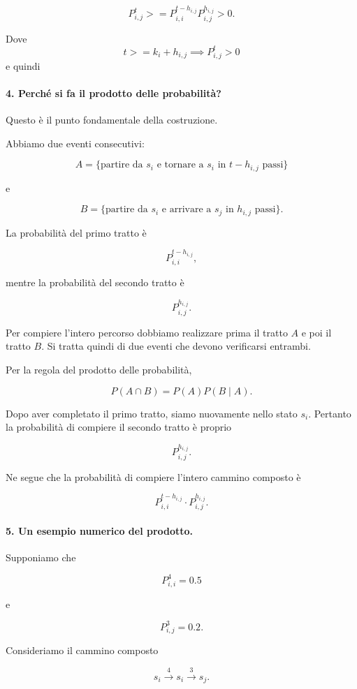 $$
P^{t}_{i,j}>= P^{t-h_{i,j}}_{i,i} P^{h_{i,j}}_{i,j} > 0.
$$

Dove 
$$
t >= k_i + h_{i,j} \implies P^{t}_{i,j} > 0
$$
e quindi


\paragraph{4. Perché si fa il prodotto delle probabilità?}

Questo è il punto fondamentale della costruzione.

Abbiamo due eventi consecutivi:

$$
A=
\{\text{partire da $s_i$ e tornare a $s_i$ in $t-h_{i,j}$ passi}\}
$$

e

$$
B=
\{\text{partire da $s_i$ e arrivare a $s_j$ in $h_{i,j}$ passi}\}.
$$

La probabilità del primo tratto è

$$
P^{t-h_{i,j}}_{i,i},
$$

mentre la probabilità del secondo tratto è

$$
P^{h_{i,j}}_{i,j}.
$$

Per compiere l'intero percorso dobbiamo realizzare prima il tratto $A$ e poi il tratto $B$. Si tratta quindi di due eventi che devono verificarsi entrambi.

Per la regola del prodotto delle probabilità,

$$
P(A\cap B)
=
P(A)P(B\mid A).
$$

Dopo aver completato il primo tratto, siamo nuovamente nello stato $s_i$. Pertanto la probabilità di compiere il secondo tratto è proprio

$$
P^{h_{i,j}}_{i,j}.
$$

Ne segue che la probabilità di compiere l'intero cammino composto è

$$
\boxed{
P^{t-h_{i,j}}_{i,i}
\cdot
P^{h_{i,j}}_{i,j}.
}
$$

\paragraph{5. Un esempio numerico del prodotto.}

Supponiamo che

$$
P^4_{i,i}=0.5
$$

e

$$
P^3_{i,j}=0.2.
$$

Consideriamo il cammino composto

$$
s_i
\overset{4}{\longrightarrow}
s_i
\overset{3}{\longrightarrow}
s_j.
$$

